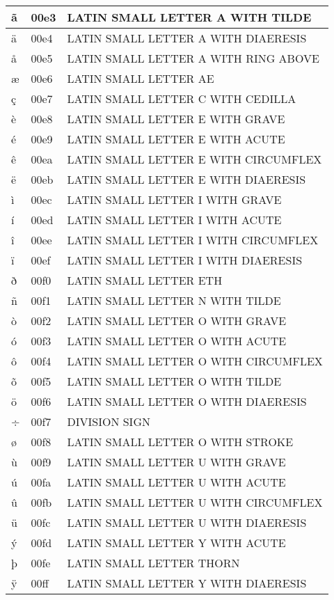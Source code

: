 \documentclass[12pt,letterpaper,openany]{book}
\begin{document}
\begin{center}
\begin{supertabular}{|m{0.25in}|m{0.5in}|m{4in}|}
ã & 00e3 & LATIN SMALL LETTER A WITH TILDE\\\hline
ä & 00e4 & LATIN SMALL LETTER A WITH DIAERESIS\\\hline
å & 00e5 & LATIN SMALL LETTER A WITH RING ABOVE\\\hline
æ & 00e6 & LATIN SMALL LETTER AE\\\hline
ç & 00e7 & LATIN SMALL LETTER C WITH CEDILLA\\\hline
è & 00e8 & LATIN SMALL LETTER E WITH GRAVE\\\hline
é & 00e9 & LATIN SMALL LETTER E WITH ACUTE\\\hline
ê & 00ea & LATIN SMALL LETTER E WITH CIRCUMFLEX\\\hline
ë & 00eb & LATIN SMALL LETTER E WITH DIAERESIS\\\hline
ì & 00ec & LATIN SMALL LETTER I WITH GRAVE\\\hline
í & 00ed & LATIN SMALL LETTER I WITH ACUTE\\\hline
î & 00ee & LATIN SMALL LETTER I WITH CIRCUMFLEX\\\hline
ï & 00ef & LATIN SMALL LETTER I WITH DIAERESIS\\\hline
ð & 00f0 & LATIN SMALL LETTER ETH\\\hline
ñ & 00f1 & LATIN SMALL LETTER N WITH TILDE\\\hline
ò & 00f2 & LATIN SMALL LETTER O WITH GRAVE\\\hline
ó & 00f3 & LATIN SMALL LETTER O WITH ACUTE\\\hline
ô & 00f4 & LATIN SMALL LETTER O WITH CIRCUMFLEX\\\hline
õ & 00f5 & LATIN SMALL LETTER O WITH TILDE\\\hline
ö & 00f6 & LATIN SMALL LETTER O WITH DIAERESIS\\\hline
÷ & 00f7 & DIVISION SIGN\\\hline
ø & 00f8 & LATIN SMALL LETTER O WITH STROKE\\\hline
ù & 00f9 & LATIN SMALL LETTER U WITH GRAVE\\\hline
ú & 00fa & LATIN SMALL LETTER U WITH ACUTE\\\hline
û & 00fb & LATIN SMALL LETTER U WITH CIRCUMFLEX\\\hline
ü & 00fc & LATIN SMALL LETTER U WITH DIAERESIS\\\hline
ý & 00fd & LATIN SMALL LETTER Y WITH ACUTE\\\hline
þ & 00fe & LATIN SMALL LETTER THORN\\\hline
ÿ & 00ff & LATIN SMALL LETTER Y WITH DIAERESIS\\\hline

\end{supertabular}
\end{center}
\end{document}
